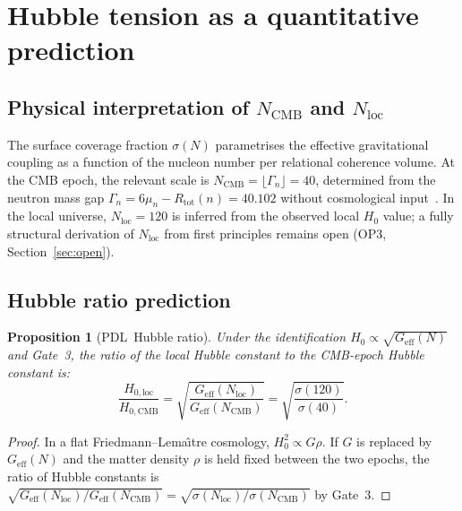 \documentclass[11pt,a4paper]{article}
\newtheorem{proposition}[theorem]{Proposition}
\theoremstyle{definition}
\newcommand{\PDL}{\textnormal{PDL}}
\newcommand{\Rtot}{R_{\mathrm{tot}}}
\newcommand{\Geff}{G_{\mathrm{eff}}}
\newcommand{\sig}{\sigma}
\begin{document}
\section{Hubble tension as a quantitative prediction}
\label{sec:hubble}

\subsection{Physical interpretation of \texorpdfstring{$N_{\mathrm{CMB}}$ and $N_{\mathrm{loc}}$}{NCMB and Nloc}}

The surface coverage fraction $\sig(N)$ parametrises the effective gravitational coupling as a function of the nucleon number per relational coherence volume. At the CMB epoch, the relevant scale is $N_{\mathrm{CMB}} = \lfloor\Gamma_n\rfloor = 40$, determined from the neutron mass gap $\Gamma_n = 6\mu_n - \Rtot(n) = 40.102$ without cosmological input~\cite{N_CMB_PDL_2026}. In the local universe, $N_{\mathrm{loc}} = 120$ is inferred from the observed local $H_0$ value; a fully structural derivation of $N_{\mathrm{loc}}$ from first principles remains open (OP3, Section~\ref{sec:open}).

\subsection{Hubble ratio prediction}

\begin{proposition}[\PDL\ Hubble ratio]
\label{prop:hubble}
Under the identification $H_0 \propto \sqrt{\Geff(N)}$ and Gate~3, the ratio of the local Hubble constant to the CMB-epoch Hubble constant is:
\begin{equation}
\frac{H_{0,\mathrm{loc}}}{H_{0,\mathrm{CMB}}} = \sqrt{\frac{\Geff(N_{\mathrm{loc}})}{\Geff(N_{\mathrm{CMB}})}} = \sqrt{\frac{\sig(120)}{\sig(40)}}.
\label{eq:Hubble_ratio}
\end{equation}
\end{proposition}

\begin{proof}
In a flat Friedmann--Lema\^\i tre cosmology, $H_0^2 \propto G\rho$. If $G$ is replaced by $\Geff(N)$ and the matter density $\rho$ is held fixed between the two epochs, the ratio of Hubble constants is $\sqrt{\Geff(N_{\mathrm{loc}})/\Geff(N_{\mathrm{CMB}})} = \sqrt{\sig(N_{\mathrm{loc}})/\sig(N_{\mathrm{CMB}})}$ by Gate~3.
\end{proof}
\end{document}
